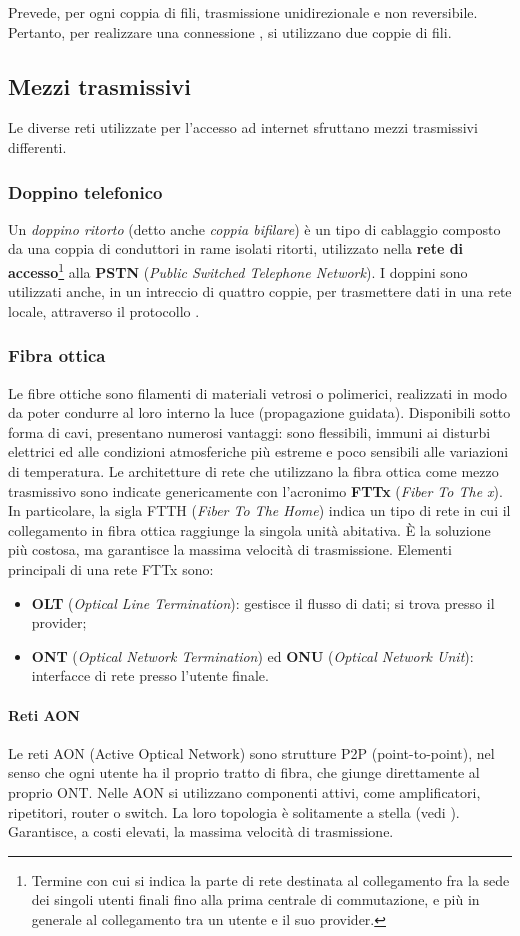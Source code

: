 \documentclass[a4paper,11pt]{article}
\def\sub#1{\subsection{#1}\label{#1}}
\def\subsub#1{\subsubsection{#1}\label{#1}}
\def\vedi#1{\nameref{#1}}
\begin{document}
Prevede, per ogni coppia di fili, trasmissione unidirezionale e non reversibile. Pertanto, per realizzare una connessione \vedi{Full-Duplex}, si utilizzano due coppie di fili. 
\sub{Mezzi trasmissivi}
Le diverse reti utilizzate per l'accesso ad internet sfruttano mezzi trasmissivi differenti.
\subsub{Doppino telefonico}
Un \textit{doppino ritorto} (detto anche \textit{coppia bifilare}) è un tipo di cablaggio composto da una coppia di conduttori in rame isolati ritorti, utilizzato nella \textbf{rete di accesso}\footnote{Termine con cui si indica la parte di rete destinata al collegamento fra la sede dei singoli utenti finali fino alla prima centrale di commutazione, e più in generale al collegamento tra un utente e il suo provider.} alla \textbf{PSTN} (\textit{Public Switched Telephone Network}).
I doppini sono utilizzati anche, in un intreccio di quattro coppie, per trasmettere dati in una rete locale, attraverso il protocollo \vedi{Ethernet}. %
\subsub{Fibra ottica}
Le fibre ottiche sono filamenti di materiali vetrosi o polimerici, realizzati in modo da poter condurre al loro interno la luce (propagazione guidata). Disponibili sotto forma di cavi, presentano numerosi vantaggi: sono flessibili, immuni ai disturbi elettrici ed alle condizioni atmosferiche più estreme e poco sensibili alle variazioni di temperatura.
Le architetture di rete che utilizzano la fibra ottica come mezzo trasmissivo sono indicate genericamente con l'acronimo \textbf{FTTx} (\textit{Fiber To The x}). In particolare, la sigla FTTH (\textit{Fiber To The Home}) indica un tipo di rete in cui il collegamento in fibra ottica raggiunge la singola unità abitativa. È la soluzione più costosa, ma garantisce la massima velocità di trasmissione. 
Elementi principali di una rete FTTx sono:
\begin{itemize}
\item \textbf{OLT} (\textit{Optical Line Termination}): gestisce il flusso di dati; si trova presso il provider;
\item \textbf{ONT} (\textit{Optical Network Termination}) ed \textbf{ONU} (\textit{Optical Network Unit}): interfacce di rete presso l'utente finale.
\end{itemize}
\paragraph{Reti AON} Le reti AON (Active Optical Network) sono strutture P2P (point-to-point), nel senso che ogni utente ha il proprio tratto di fibra, che giunge direttamente al proprio ONT. Nelle AON si utilizzano componenti attivi, come amplificatori, ripetitori, router o switch. La loro topologia è solitamente a stella (vedi \vedi{Rete a stella}). Garantisce, a costi elevati, la massima velocità di trasmissione.
\end{document}
